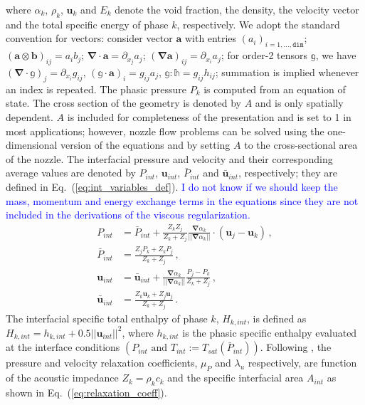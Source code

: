 \documentclass[preprint,10pt]{elsarticle}
\renewcommand{\div}{\mbold{\nabla}\! \cdot \!}
\newcommand{\grad}{\mbold{\nabla}}
\newcommand{\mbold}[1]{\boldsymbol#1}
\newcommand{\eqt}[1]{Eq.~(\ref{#1})}                     %
\newcommand{\tcb}[1]{\textcolor{blue}{#1}}
\begin{document}
%
where $\alpha_k$, $\rho_k$, $\mbold u_k$ and $E_k$ denote the void fraction, the density, the velocity vector and the total specific energy of phase $k$, respectively. We adopt the standard convention for vectors: consider vector $\mbold{a}$ with entries $(a_i)_{i=1,\ldots,\texttt{dim}}$; $(\mbold{a} \otimes \mbold{b})_{ij}=a_i b_j$;
$\div \mbold{a}= \partial_{x_j} a_j$; $(\grad \mbold{a})_{ij} = \partial_{x_i} a_j$; for order-2 tensors $\mathbb{g}$, we have $(\div \mathbb{g})_j = \partial_{x_i} g_{ij}$, $(\mathbb{g}\cdot \mbold{a})_i = g_{ij}a_j$, $\mathbb{g}:\mathbb{h} = g_{ij} h_{ij}$; summation is implied whenever an index is repeated. 
The phasic pressure $P_k$ is computed from an equation of state. The cross section of the geometry is denoted by $A$ and is only spatially dependent. $A$ is included for completeness of the presentation and is set to 1 in most applications; however, nozzle flow problems can be solved using the one-dimensional version of the equations and by setting $A$ to the cross-sectional area of the nozzle. The interfacial pressure and velocity and their corresponding average values are denoted by $P_{int}$, $\mbold u_{int}$, $\bar{P}_{int}$ and $\bar{\mbold u}_{int}$, respectively; they are defined in \eqt{eq:int_variables_def}.
\tcb{I do not know if we should keep the mass, momentum and energy exchange terms in the equations since they are not included in the derivations of the viscous regularization.} 
%
\begin{subequations}
\label{eq:int_variables_def}
\begin{align}
  \label{E-R:83}
  P_{int} &= \bar{P}_{int} + \frac{Z_{k}Z_{j}}{Z_{k}+Z_{j}} \frac{\grad \alpha_{k}}{|| \grad \alpha_{k} ||} \cdot (\mbold u_{j}-\mbold u_{k}) \,,
  \\
  \bar{P}_{int} &= \frac{Z_{j}P_{k}+Z_{k}P_{j}}{Z_{k}+Z_{j}} \,,
 \\
  \label{E-R:84}
  \mbold u_{int} &= \bar{\mbold u}_{int} +  \frac{\grad \alpha_{k}}{|| \grad \alpha_{k} ||} \frac{P_{j}-P_{k}}{Z_{k}+Z_{j}} \,,
  \\
  \bar{\mbold u}_{int} &= \frac{Z_{k} \mbold u_{k}+Z_{j}\mbold u_{j}}{Z_{k}+Z_{j}} \,.
\end{align}
\end{subequations}
%
The interfacial specific total enthalpy of phase $k$, $H_{k,int}$, is defined as $H_{k,int} = h_{k,int} + 0.5 || \mbold u_{int} ||^2$, where $h_{k,int}$ is the phasic specific enthalpy evaluated at the interface conditions $(P_{int} \text{ and } T_{int} := T_{sat}(\bar{P}_{int}))$. Following \cite{SEM}, the pressure and velocity relaxation coefficients, $\mu_P$  and $\lambda_u$ respectively, are function of the acoustic impedance $Z_k = \rho_k c_k$ and the specific interfacial area $A_{int}$ as shown in \eqt{eq:relaxation_coeff}.
\end{document}
